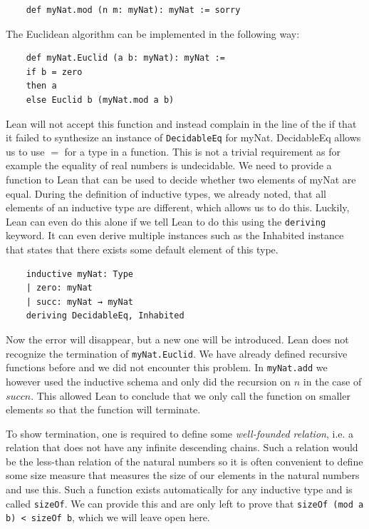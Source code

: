 \begin{lstlisting}
    def myNat.mod (n m: myNat): myNat := sorry
\end{lstlisting}

The Euclidean algorithm can be implemented in the following way:

\begin{lstlisting}
    def myNat.Euclid (a b: myNat): myNat :=
    if b = zero
    then a
    else Euclid b (myNat.mod a b)
\end{lstlisting}

Lean will not accept this function and instead complain in the line of the if that it failed to synthesize an instance of \lstinline|DecidableEq| for myNat. DecidableEq allows us to use $=$ for a type in a function. This is not a trivial requirement as for example the equality of real numbers is undecidable\cite{EqualityRealNumber}. We need to provide a function to Lean that can be used to decide whether two elements of myNat are equal. During the definition of inductive types, we already noted, that all elements of an inductive type are different, which allows us to do this. Luckily, Lean can even do this alone if we tell Lean to do this using the \lstinline|deriving| keyword. It can even derive multiple instances such as the Inhabited instance that states that there exists some default element of this type.

\begin{lstlisting}
    inductive myNat: Type
    | zero: myNat
    | succ: myNat → myNat
    deriving DecidableEq, Inhabited

\end{lstlisting}

Now the error will disappear, but a new one will be introduced. Lean does not recognize the termination of \lstinline|myNat.Euclid|. We have already defined recursive functions before and we did not encounter this problem. In \lstinline|myNat.add| we however used the inductive schema and only did the recursion on $n$ in the case of $succ n$. This allowed Lean to conclude that we only call the function on smaller elements so that the function will terminate.

To show termination, one is required to define some \textit{well-founded relation}, i.e. a relation that does not have any infinite descending chains. Such a relation would be the less-than relation of the natural numbers so it is often convenient to define some size measure that measures the size of our elements in the natural numbers and use this. Such a function exists automatically for any inductive type and is called \lstinline|sizeOf|. We can provide this and are only left to prove that \lstinline|sizeOf (mod a b) < sizeOf b|, which we will leave open here.

